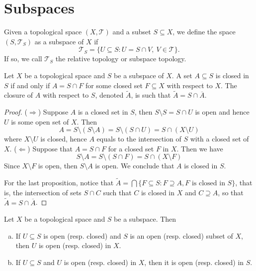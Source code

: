 \section{Subspaces}

\begin{definition}
  \label{def: subspace topology}
  Given a topological space \((X, \mathcal T)\) and a subset \(S \subseteq X\),
  we define the space \((S, \mathcal T_S)\) as a subspace of \(X\) if
  \[
    \mathcal T_S = \{U \subseteq S: U = S \cap V,\ V \in \mathcal T\}.
  \]
  If so, we call \(\mathcal T_S\) the relative topology or subspace topology.
\end{definition}

\begin{proposition}\label{prop: closed in subspace}
  Let \(X\) be a topological space and \(S\) be a subspace of \(X\). A set \(A
  \subseteq S\) is closed in \(S\) if and only if \(A = S \cap F\) for some
  closed set \(F \subseteq X\) with respect to \(X\). The closure of \(A\) with
  respect to \(S\), denoted \(\widetilde A\), is such that \(\widetilde A = S
  \cap \overline A\).
\end{proposition}

\begin{proof}
  (\(\Rightarrow\)) Suppose \(A\) is a closed set in \(S\), then \(S \setminus
  S = S \cap U\) is open and hence \(U\) is some open set of \(X\). Then
  \[
    A = S \setminus (S \setminus A) = S \setminus (S \cap U)
    = S \cap (X \setminus U)
  \]
  where \(X \setminus U\) is closed, hence \(A\) equals to the intersection of
  \(S\) with a closed set of \(X\).
  (\(\Leftarrow\)) Suppose that \(A = S \cap F\) for a closed set \(F\) in
  \(X\). Then we have
  \[
    S \setminus A = S \setminus (S \cap F) = S \cap (X \setminus F)
  \]
  Since \(X\setminus F\) is open, then \(S \setminus A\) is open. We conclude
  that \(A\) is closed in \(S\).

  For the last proposition, notice that \(\widetilde A = \bigcap \{F \subseteq S
  : F \supseteq A, F \text{ is closed in } S\}\), that is, the intersection of
  sets \(S \cap C\) such that \(C\) is closed in \(X\) and \(C \supseteq A\), so
  that \(\widetilde A = S \cap \overline A\).
\end{proof}

\begin{proposition}\label{prop: relative open to open}
  Let \(X\) be a topological space and \(S\) be a subspace. Then
  \begin{enumerate}[(a)]
    \item If \(U \subseteq S\) is open (resp. closed) and \(S\) is an open
      (resp. closed) subset of \(X\), then \(U\) is open (resp. closed) in
      \(X\).
    \item If \(U \subseteq S\) and \(U\) is open (resp. closed) in \(X\), then
      it is open (resp. closed) in \(S\).
  \end{enumerate}
\end{proposition}

